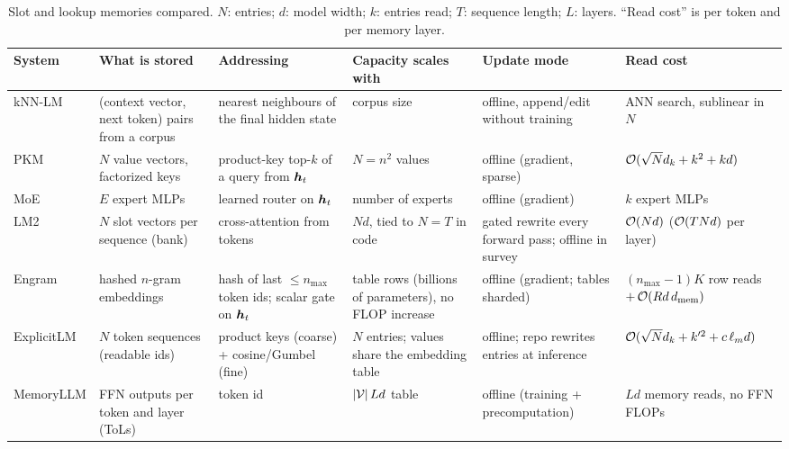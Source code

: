 \begin{table}[t]
\centering
\footnotesize
\caption{Slot and lookup memories compared. $N$: entries; $d$: model width; $k$: entries read; $T$:
sequence length; $L$: layers. ``Read cost'' is per token and per memory layer.}
\label{tab:c10-comparison}
\setlength{\tabcolsep}{3pt}
\begin{tabularx}{\linewidth}{@{}>{\raggedright\arraybackslash}p{1.85cm}
  >{\raggedright\arraybackslash}X >{\raggedright\arraybackslash}X
  >{\raggedright\arraybackslash}X >{\raggedright\arraybackslash}X
  >{\raggedright\arraybackslash}p{2.1cm}@{}}
\toprule
System & What is stored & Addressing & Capacity scales with & Update mode & Read cost \\
\midrule
kNN-LM & (context vector, next token) pairs from a corpus & nearest neighbours of the final hidden state & corpus size & offline, append/edit without training & ANN search, sublinear in $N$ \\
PKM & $N$ value vectors, factorized keys & product-key top-$k$ of a query from $\bm{h}_t$ & $N = n^2$ values & offline (gradient, sparse) & $\mathcal{O}(\sqrt{N} d_k + k^2 + k d)$ \\
MoE & $E$ expert MLPs & learned router on $\bm{h}_t$ & number of experts & offline (gradient) & $k$ expert MLPs \\
\midrule
LM2 & $N$ slot vectors per sequence (bank) & cross-attention from tokens & $N d$, tied to $N = T$ in code & gated rewrite every forward pass; offline in survey & $\mathcal{O}(N d)$ ($\mathcal{O}(TNd)$ per layer) \\
Engram & hashed $n$-gram embeddings & hash of last $\le n_{\max}$ token ids; scalar gate on $\bm{h}_t$ & table rows (billions of parameters), no FLOP increase & offline (gradient; tables sharded) & $(n_{\max}{-}1)K$ row reads $+\,\mathcal{O}(R d\, d_{\mathrm{mem}})$ \\
ExplicitLM & $N$ token sequences (readable ids) & product keys (coarse) + cosine/Gumbel (fine) & $N$ entries; values share the embedding table & offline; repo rewrites entries at inference & $\mathcal{O}(\sqrt{N}d_k + k'^2 + c\,\ell_m d)$ \\
MemoryLLM & FFN outputs per token and layer (ToLs) & token id & $\left\lvert \mathcal{V}\right\rvert L d$ table & offline (training + precomputation) & $L d$ memory reads, no FFN FLOPs \\
\bottomrule
\end{tabularx}
\end{table}

